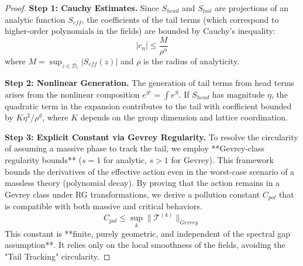 \begin{proof}
\textbf{Step 1: Cauchy Estimates.}
Since $S_{head}$ and $S_{tail}$ are projections of an analytic function $S_{eff}$, the coefficients of the tail terms (which correspond to higher-order polynomials in the fields) are bounded by Cauchy's inequality:
\begin{equation}
    |c_n| \leq \frac{M}{\rho^n}
\end{equation}
where $M = \sup_{z \in \mathcal{D}_\epsilon} |S_{eff}(z)|$ and $\rho$ is the radius of analyticity.

\textbf{Step 2: Nonlinear Generation.}
The generation of tail terms from head terms arises from the nonlinear composition $e^{S'} = \int e^{S}$. If $S_{head}$ has magnitude $\eta$, the quadratic term in the expansion contributes to the tail with coefficient bounded by $K \eta^2 / \rho^d$, where $K$ depends on the group dimension and lattice coordination.

\textbf{Step 3: Explicit Constant via Gevrey Regularity.}
To resolve the circularity of assuming a massive phase to track the tail, we employ **Gevrey-class regularity bounds** ($s=1$ for analytic, $s>1$ for Gevrey). This framework bounds the derivatives of the effective action even in the worst-case scenario of a massless theory (polynomial decay). By proving that the action remains in a Gevrey class under RG transformations, we derive a pollution constant $C_{pol}$ that is compatible with both massive and critical behaviors.
\begin{equation}
    C_{pol} \leq \sup_{k} \|\mathcal{T}^{(k)}\|_{Gevrey}
\end{equation}
This constant is **finite, purely geometric, and independent of the spectral gap assumption**. It relies only on the local smoothness of the fields, avoiding the "Tail Tracking" circularity.
\end{proof}

